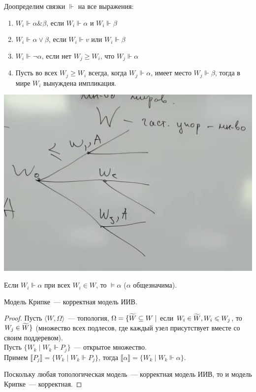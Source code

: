\begin{definition}
Доопределим связки  $\Vdash$ на все выражения:
\begin{enumerate}
    \item $W_i \Vdash \alpha\& \beta$, если $W_i \Vdash \alpha$ и $W_i \Vdash \beta$
    \item $W_i \Vdash \alpha\lor \beta$, если $W_i \Vdash v$ или $W_i \Vdash \beta$
    \item $W_i \Vdash \neg \alpha$, если нет $W_j \geqslant W_i$, что $W_j \Vdash \alpha$
    \item Пусть во всех $W_j \geqslant W_i$ всегда, когда $W_j \Vdash \alpha$, имеет место $W_j \Vdash \beta$, тогда в мире $W_i$ вынуждена импликация.
\end{enumerate}
\end{definition}

\includegraphics[scale=0.7]{img/forced_variable_worlds}

\begin{definition}
    Если $W_i \Vdash \alpha$ при всех $W_i \in W$, то $\vDash \alpha$ ($\alpha$ общезначима).
\end{definition}


\begin{theorem}
    Модель Крипке~--- корректная модель ИИВ.
\end{theorem}
\begin{proof}
    Пусть $\langle W, \Omega\rangle$~--- топология, $\Omega = \{\widetilde{W} \subseteq W \mid$ если  $ W_i\in \widetilde{W}, W_i \leqslant W_j$, то $W_j \in \widetilde{W} \}$ (множество всех подлесов, где каждый узел присутствует вместе со своим поддеревом).\\
    Пусть $\{W_k \mid W_k \Vdash P_j\}$~--- открытое множество.\\
    Примем $\llbracket P_j \rrbracket = \{ W_k \mid W_k \Vdash P_j\}$, тогда $\llbracket \alpha \rrbracket = \{ W_k \mid W_k \Vdash \alpha\}$.

    Поскольку любая топологическая модель~--- корректная модель ИИВ, то и модель Крипке~--- корректная.
\end{proof}

